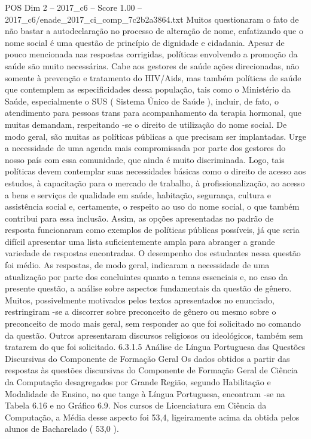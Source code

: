 \begin{textsample}{POS Dim 2 – 2017\_c6 – Score 1.00 – 2017\_c6/enade\_2017\_ci\_comp\_7c2b2a3864.txt}
Muitos questionaram o fato de não bastar a autodeclaração no processo de alteração de nome, enfatizando que o nome social é uma questão de princípio de dignidade e cidadania.
Apesar de pouco mencionada nas respostas corrigidas, políticas envolvendo a promoção da saúde são muito necessárias.
Cabe aos gestores de saúde ações direcionadas, não somente à prevenção e tratamento do HIV/Aids, mas também políticas de saúde que contemplem as especificidades dessa população, tais como o Ministério da Saúde, especialmente o SUS ( Sistema Único de Saúde ), incluir, de fato, o atendimento para pessoas trans para acompanhamento da terapia hormonal, que muitas demandam, respeitando -se o direito de utilização do nome social.
De modo geral, são muitas as políticas públicas a que precisam ser implantadas.
Urge a necessidade de uma agenda mais compromissada por parte dos gestores do nosso país com essa comunidade, que ainda é muito discriminada.
Logo, tais políticas devem contemplar suas necessidades básicas como o direito de acesso aos estudos, à capacitação para o mercado de trabalho, à profissionalização, ao acesso a bens e serviços de qualidade em saúde, habitação, segurança, cultura e assistência social e, certamente, o respeito ao uso do nome social, o que também contribui para essa inclusão.
Assim, as opções apresentadas no padrão de resposta funcionaram como exemplos de políticas públicas possíveis, já que seria difícil apresentar uma lista suficientemente ampla para abranger a grande variedade de respostas encontradas.
O desempenho dos estudantes nessa questão foi médio.
As respostas, de modo geral, indicaram a necessidade de uma atualização por parte dos concluintes quanto a temas essenciais e, no caso da presente questão, a análise sobre aspectos fundamentais da questão de gênero.
Muitos, possivelmente motivados pelos textos apresentados no enunciado, restringiram -se a discorrer sobre preconceito de gênero ou mesmo sobre o preconceito de modo mais geral, sem responder ao que foi solicitado no comando da questão.
Outros apresentaram discursos religiosos ou ideológicos, também sem tratarem do que foi solicitado. 6.3.1.5 Análise de Língua Portuguesa das Questões Discursivas do Componente de Formação Geral Os dados obtidos a partir das respostas às questões discursivas do Componente de Formação Geral de Ciência da Computação desagregados por Grande Região, segundo Habilitação e Modalidade de Ensino, no que tange à Língua Portuguesa, encontram -se na Tabela 6.16 e no Gráfico 6.9.
Nos cursos de Licenciatura em Ciência da Computação, a Média desse aspecto foi 53,4, ligeiramente acima da obtida pelos alunos de Bacharelado ( 53,0 ).

\end{textsample}
